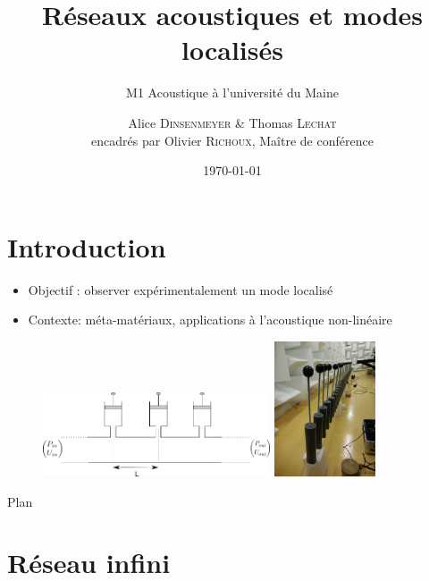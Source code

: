 \documentclass[12pt,xcolor=x11names,compress, notes=show]{beamer}%
\author{Alice \textsc{Dinsenmeyer} \& Thomas \textsc{Lechat} \\ encadrés par Olivier \textsc{Richoux}, Maître de conférence}
\title{ Réseaux acoustiques et modes localisés}
\subtitle{M1 Acoustique à l'université du Maine}
\date{\today}
\begin{document}
\begin{frame}
	\titlepage 
\end{frame}



\section*{Introduction}
\begin{frame}{\insertsectionhead}

\begin{itemize}
\item Objectif : observer expérimentalement un mode localisé
\item Contexte: méta-matériaux, applications à l'acoustique non-linéaire
\end{itemize}
	\centering
	\begin{figure}
		\centering
		\includegraphics[height=2.5cm]{schema_reseau_infini.png}\vspace{1.3cm}\hspace{0.5cm}
		\centering
		\includegraphics[height=4cm]{photo.jpg}
	\end{figure}
	
\end{frame}

\begin{frame}{Plan}
\tableofcontents[hideallsubsections]
\end{frame}


\section{Réseau infini}
\end{document}
